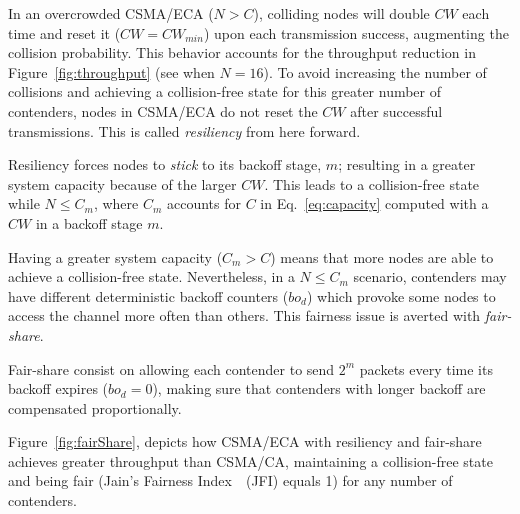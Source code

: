 

In an overcrowded CSMA/ECA ($N>C$), colliding nodes will double $CW$ each time and reset it ($CW=CW_{min}$) upon each transmission success, augmenting the collision probability. This behavior accounts for the throughput reduction in Figure~\ref{fig:throughput} (see when $N=16$). To avoid increasing the number of collisions and achieving a collision-free state for this greater number of contenders, nodes in CSMA/ECA do not reset the $CW$ after successful transmissions. This is called \emph{resiliency} from here forward.

Resiliency forces nodes to \emph{stick} to its backoff stage, $m$; resulting in a greater system capacity because of the larger $CW$. This leads to a collision-free state while $N\leq C_{m}$, where $C_{m}$ accounts for $C$ in Eq.~\ref{eq:capacity} computed with a $CW$ in a backoff stage $m$.

Having a greater system capacity ($C_{m} > C$) means that more nodes are able to achieve a collision-free state. Nevertheless, in a $N\leq C_{m}$ scenario, contenders may have different deterministic backoff counters ($bo_{d}$) which provoke some nodes to access the channel more often than others. This fairness issue is averted with \emph{fair-share}.

Fair-share consist on allowing each contender to send $2^{m}$ packets every time its backoff expires ($bo_{d}=0$), making sure that contenders with longer backoff are compensated proportionally.

Figure~\ref{fig:fairShare}, depicts how CSMA/ECA with resiliency and fair-share achieves greater throughput than CSMA/CA, maintaining a collision-free state and being fair (Jain's Fairness Index~\cite{JFI}~(JFI) equals 1) for any number of contenders.


